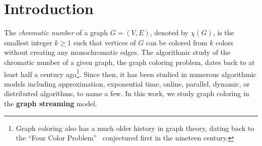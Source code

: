 \documentclass[11pt]{article}
\theoremstyle{definition}
\renewcommand{\geq}{\geqslant}
\newcommand{\rs}{{{Ruzsa-Szemerédi}}\xspace}
\begin{document}
\begin{abstract}
\begin{itemize}[leftmargin=10pt]
	\item \textbf{Dynamic:} for distinguishing between $q$- vs $q \cdot t$-colorable graphs for any $q \geq 3$ and $t \geq 1$, nearly optimal upper and lower bounds of $\widetilde{\Theta}(n^2/t^2)$ space.  
\end{itemize}

\smallskip
In establishing our results, we develop several new technical tools that may be of independent interest. These include cluster packing graphs, a generalization of \rs graphs; a player elimination framework based on cluster packing graphs; and new edge and vertex sampling lemmas tailored to graph coloring.


\end{abstract}
	
	\clearpage
	
	\setcounter{tocdepth}{3}
	\tableofcontents
	
	\clearpage
	
	\setcounter{page}{1}
	

\section{Introduction}\label{sec:intro}

The \emph{chromatic number} of a graph $G=(V,E)$, denoted by $\chi(G)$, is the smallest integer $k \geq 1$ such that vertices of $G$ can be colored from $k$ colors
without creating any monochromatic edges. The algorithmic study of the chromatic number of a given graph, the graph coloring problem, dates back to at least half a century ago\footnote{Graph coloring also has 
a much older history in graph theory, dating back to the ``Four Color Problem''~\cite{AppelH76,AppelHK77} conjectured first in the nineteen century.}. Since then, it has been studied 
in numerous algorithmic models including approximation, exponential time, online, parallel, dynamic, or distributed algorithms, to name a few. In this work, we study graph coloring in the \textbf{graph streaming} model. 
\end{document}
